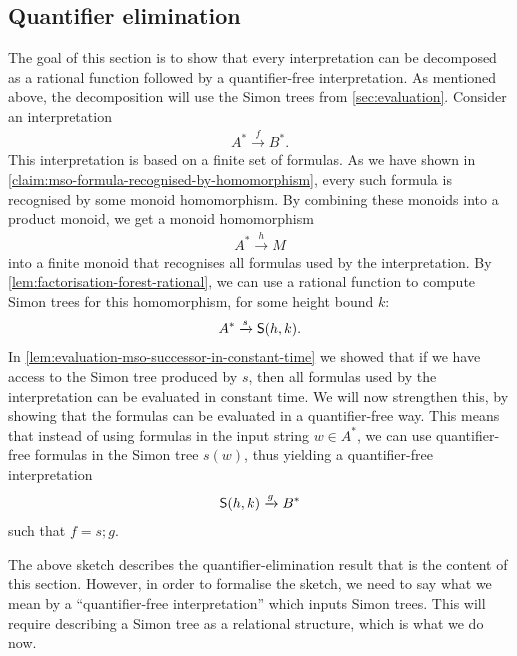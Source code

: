 \subsection{Quantifier elimination}
\label{sec:quantifier-elimination}
The goal of this section is to show that every \mso interpretation can be decomposed as a rational function followed by a quantifier-free interpretation. As mentioned above, the decomposition will use the Simon trees from \cref{sec:evaluation}. Consider an \mso interpretation
\begin{align*}
A^* \xrightarrow f B^*.
\end{align*}
This interpretation is based on a finite set of \mso formulas. As we have shown in \cref{claim:mso-formula-recognised-by-homomorphism}, every such formula is recognised by some monoid homomorphism. By combining these monoids into a product monoid, we get a monoid homomorphism 
\begin{align*}
A^* \xrightarrow h M
\end{align*}
into a finite monoid
that recognises all \mso formulas used by the interpretation. By \cref{lem:factorisation-forest-rational}, we can use a rational function to compute Simon trees for this homomorphism, for some height bound $k$: 
\begin{align*}
A^* \xrightarrow s \mathsf S(h,k).
\end{align*}
In \cref{lem:evaluation-mso-successor-in-constant-time} we showed that if we have access to the Simon tree produced by $s$, then all formulas used by the \mso interpretation can be evaluated in constant time. We will now strengthen this, by showing that the formulas can be evaluated in a quantifier-free way. This means that  instead of using \mso formulas in the input string $w \in A^*$, we can use quantifier-free formulas in the Simon tree $s(w)$, thus yielding a quantifier-free interpretation
\begin{align*}
    \mathsf S(h,k) \xrightarrow g B^*
\end{align*}
such that $f = s;g$.  

The above sketch describes  the quantifier-elimination result that is the content of  this section. 
However, in order to formalise the sketch, we need to say what we mean by a ``quantifier-free interpretation'' which inputs Simon trees. This will require describing a Simon tree as a relational structure, which is what we do now.

